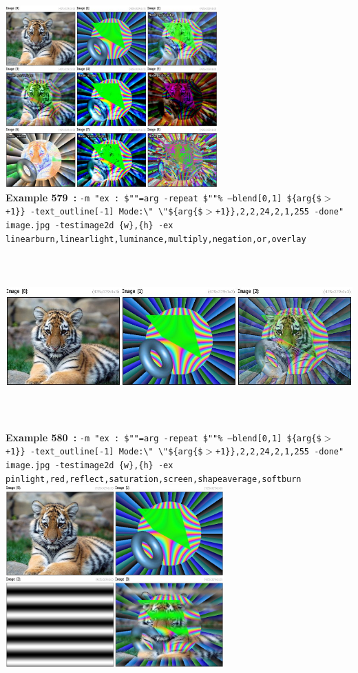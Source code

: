 \documentclass[a4paper,11pt,twoside]{book}
\begin{document}
\begin{center}
\\\includegraphics[keepaspectratio=true,height=7cm,width=\textwidth]{img/gmic_def579.jpg}\\
{\footnotesize \textbf{Example 579~:} \texttt{-m "ex : \$""=arg -repeat \$""\% --blend[0,1] \$\{arg\{\$$>$+1\}\} -text\_outline[-1] Mode:\textbackslash " \textbackslash "\$\{arg\{\$$>$+1\}\},2,2,24,2,1,255 -done" image.jpg -testimage2d \{w\},\{h\} -ex linearburn,linearlight,luminance,multiply,negation,or,overlay}}
\\\includegraphics[keepaspectratio=true,height=7cm,width=\textwidth]{img/gmic_def580.jpg}\\
{\footnotesize \textbf{Example 580~:} \texttt{-m "ex : \$""=arg -repeat \$""\% --blend[0,1] \$\{arg\{\$$>$+1\}\} -text\_outline[-1] Mode:\textbackslash " \textbackslash "\$\{arg\{\$$>$+1\}\},2,2,24,2,1,255 -done" image.jpg -testimage2d \{w\},\{h\} -ex pinlight,red,reflect,saturation,screen,shapeaverage,softburn}}
\\\includegraphics[keepaspectratio=true,height=7cm,width=\textwidth]{img/gmic_def581.jpg}\\

\end{center}
\end{document}
